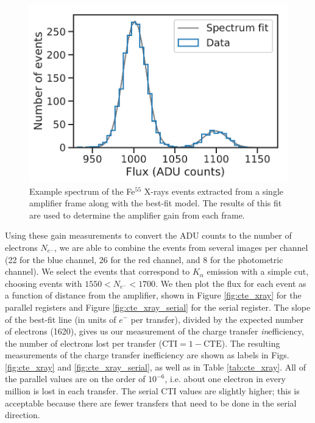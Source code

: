 \begin{figure}
    \centering
    \includegraphics{figures/cte/spectrum_fit.pdf}
    \caption{Example spectrum of the Fe$^{55}$ X-rays events extracted from a single amplifier frame along with the best-fit model. The results of this fit are used to determine the amplifier gain from each frame.}
    \label{fig:xray_spectrum}
\end{figure}

Using these gain measurements to convert the ADU counts to the number of electrons $N_{e^-}$, we are able to combine the events from several images per channel (22 for the blue channel, 26 for the red channel, and 8 for the photometric channel). We select the events that correspond to $K_\alpha$ emission with a simple cut, choosing events with $1550 < N_{e^-} < 1700$. We then plot the flux for each event as a function of distance from the amplifier, shown in Figure \ref{fig:cte_xray} for the parallel registers and Figure \ref{fig:cte_xray_serial} for the serial register. The slope of the best-fit line (in units of $e^-$ per transfer), divided by the expected number of electrons (1620), gives us our measurement of the charge transfer \textit{in}efficiency, the number of electrons lost per transfer ($\textrm{CTI}=1-\textrm{CTE}$). The resulting measurements of the charge transfer inefficiency are shown as labels in Figs. \ref{fig:cte_xray} and \ref{fig:cte_xray_serial}, as well as in Table \ref{tab:cte_xray}. All of the parallel values are on the order of $10^{-6}$, i.e. about one electron in every million is lost in each transfer. The serial CTI values are slightly higher; this is acceptable because there are fewer transfers that need to be done in the serial direction.

